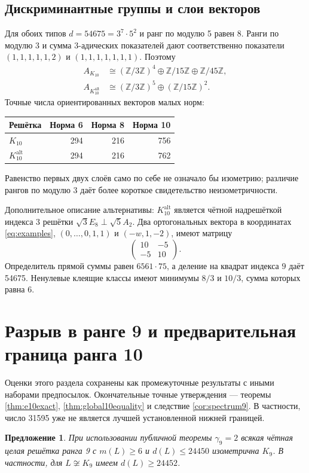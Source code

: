 \documentclass[11pt,a4paper]{article}
\newtheorem{proposition}[theorem]{Предложение}
\theoremstyle{remark}\newtheorem{remark}[theorem]{Замечание}
\newcommand{\Z}{\mathbb Z}\newcommand{\R}{\mathbb R}\newcommand{\F}{\mathbb F}
\newcommand{\Kalt}{K_{10}^{\mathrm{alt}}}
\begin{document}
\subsection{Дискриминантные группы и слои векторов}

Для обоих типов $d=54675=3^7\cdot5^2$ и ранг по модулю 5 равен 8. Ранги по модулю 3 и сумма $3$-адических показателей дают соответственно показатели $(1,1,1,1,1,2)$ и $(1,1,1,1,1,1,1)$. Поэтому
\begin{align*}
A_{K_{10}}&\cong(\Z/3\Z)^4\oplus\Z/15\Z\oplus\Z/45\Z,\\
A_{\Kalt}&\cong(\Z/3\Z)^5\oplus(\Z/15\Z)^2.
\end{align*}
Точные числа ориентированных векторов малых норм:
\begin{center}
\begin{tabular}{lrrr}
\toprule
Решётка &Норма 6&Норма 8&Норма 10\\\midrule
$K_{10}$&294&216&756\\
$\Kalt$&294&216&762\\
\bottomrule
\end{tabular}
\end{center}
Равенство первых двух слоёв само по себе не означало бы изометрию; различие рангов по модулю 3 даёт более короткое свидетельство неизометричности.

Дополнительное описание альтернативы: $\Kalt$ является чётной надрешёткой индекса 3 решётки $\sqrt3E_8\perp\sqrt5A_2$. Два ортогональных вектора в координатах \eqref{eq:examples}, $(0,\ldots,0,1,1)$ и $(-w,1,-2)$, имеют матрицу
\[
\begin{pmatrix}10&-5\\-5&10\end{pmatrix}.
\]
Определитель прямой суммы равен $6561\cdot75$, а деление на квадрат индекса $9$ даёт 54675. Ненулевые клеящие классы имеют минимумы $8/3$ и $10/3$, сумма которых равна 6.

\section{Разрыв в ранге 9 и предварительная граница ранга 10}

Оценки этого раздела сохранены как промежуточные результаты с иными наборами предпосылок. Окончательные точные утверждения --- теоремы \ref{thm:e10exact}, \ref{thm:global10equality} и следствие \ref{cor:spectrum9}. В частности, число 31595 уже не является лучшей установленной нижней границей.

\begin{proposition}\label{prop:gap}
При использовании публичной теоремы $\gamma_9=2$ всякая чётная целая решётка ранга 9 с $m(L)\ge6$ и $d(L)\le24450$ изометрична $K_9$. В частности, для $L\not\cong K_9$ имеем $d(L)\ge24452$.
\end{proposition}
\end{document}
